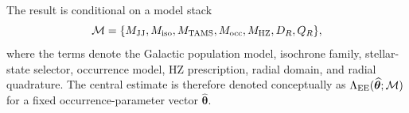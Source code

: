 \documentclass[twocolumn]{aastex631}
\newcommand{\LamEE}{\Lambda_{\rm EE}}
\begin{document}
The result is conditional on a model stack
\begin{equation}
 \mathcal{M}=\{M_{\rm JJ},M_{\rm iso},M_{\rm TAMS},
 M_{\rm occ},M_{\rm HZ},D_R,Q_R\},
 \label{eq:model_stack}
\end{equation}
where the terms denote the Galactic population model, isochrone family, stellar-state selector, occurrence model, HZ prescription, radial domain, and radial quadrature. The central estimate is therefore denoted conceptually as $\LamEE(\widehat{\bm\theta};\mathcal{M})$ for a fixed occurrence-parameter vector $\widehat{\bm\theta}$.










\end{document}
